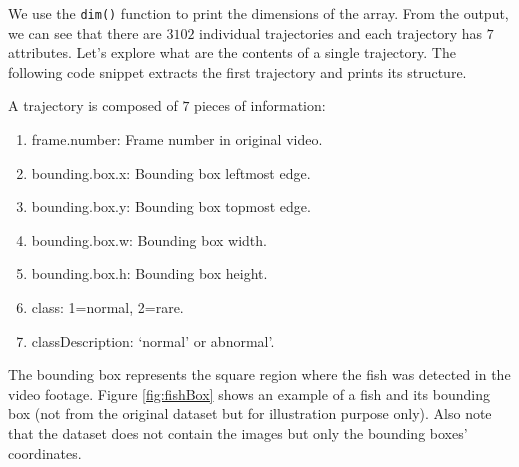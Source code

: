 \documentclass[
  11pt,
]{krantz}
\newenvironment{Shaded}{\begin{snugshade}}{\end{snugshade}}
\newcommand{\CommentTok}[1]{\textcolor[rgb]{0.37,0.37,0.37}{\textit{#1}}}
\newcommand{\DecValTok}[1]{\textcolor[rgb]{0.06,0.06,0.06}{#1}}
\newcommand{\FunctionTok}[1]{\textcolor[rgb]{0,0,0}{#1}}
\newcommand{\NormalTok}[1]{#1}
\newcommand{\OtherTok}[1]{\textcolor[rgb]{0.37,0.37,0.37}{#1}}
\providecommand{\tightlist}{%
  \setlength{\itemsep}{0pt}\setlength{\parskip}{0pt}}
\begin{document}
We use the \texttt{dim()} function to print the dimensions of the array. From the output, we can see that there are \(3102\) individual trajectories and each trajectory has \(7\) attributes. Let's explore what are the contents of a single trajectory. The following code snippet extracts the first trajectory and prints its structure.

\begin{Shaded}
\end{Shaded}

A trajectory is composed of \(7\) pieces of information:

\begin{enumerate}
\def\labelenumi{\arabic{enumi}.}
\tightlist
\item
  frame.number: Frame number in original video.
\item
  bounding.box.x: Bounding box leftmost edge.
\item
  bounding.box.y: Bounding box topmost edge.
\item
  bounding.box.w: Bounding box width.
\item
  bounding.box.h: Bounding box height.
\item
  class: 1=normal, 2=rare.
\item
  classDescription: `normal' or abnormal'.
\end{enumerate}

The bounding box represents the square region where the fish was detected in the video footage. Figure \ref{fig:fishBox} shows an example of a fish and its bounding box (not from the original dataset but for illustration purpose only). Also note that the dataset does not contain the images but only the bounding boxes' coordinates.
\end{document}
